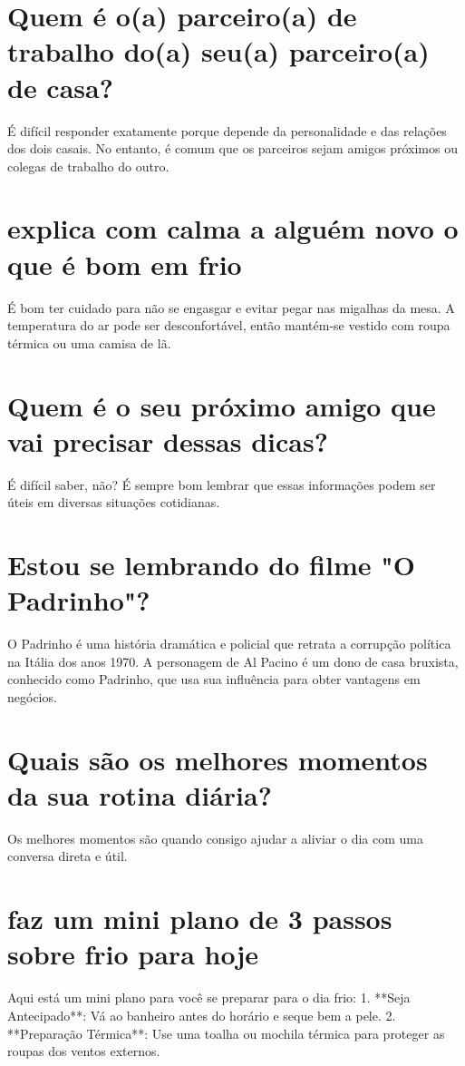 \documentclass[11pt,a4paper]{article}
\begin{document}
\section{Quem é o(a) parceiro(a) de trabalho do(a) seu(a) parceiro(a) de casa?}
É difícil responder exatamente porque depende da personalidade e das relações dos dois casais. No entanto, é comum que os parceiros sejam amigos próximos ou colegas de trabalho do outro.

\section{explica com calma a alguém novo o que é bom em frio}
É bom ter cuidado para não se engasgar e evitar pegar nas migalhas da mesa. A temperatura do ar pode ser desconfortável, então mantém-se vestido com roupa térmica ou uma camisa de lã.

\section{Quem é o seu próximo amigo que vai precisar dessas dicas?}
É difícil saber, não? É sempre bom lembrar que essas informações podem ser úteis em diversas situações cotidianas.

\section{Estou se lembrando do filme "O Padrinho"?}
O Padrinho é uma história dramática e policial que retrata a corrupção política na Itália dos anos 1970. A personagem de Al Pacino é um dono de casa bruxista, conhecido como Padrinho, que usa sua influência para obter vantagens em negócios.

\section{Quais são os melhores momentos da sua rotina diária?}
Os melhores momentos são quando consigo ajudar a aliviar o dia com uma conversa direta e útil.

\section{faz um mini plano de 3 passos sobre frio para hoje}
Aqui está um mini plano para você se preparar para o dia frio: 1. **Seja Antecipado**: Vá ao banheiro antes do horário e seque bem a pele. 2. **Preparação Térmica**: Use uma toalha ou mochila térmica para proteger as roupas dos ventos externos.
\end{document}
